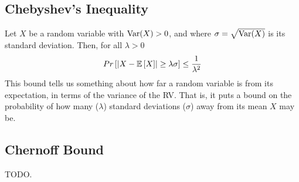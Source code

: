 \documentclass[10pt,a4paper]{article}
\begin{document}
\subsection*{Chebyshev's Inequality}

Let $X$ be a random variable with $\text{Var}(X) > 0$, and where $\sigma = \sqrt{\text{Var}(X)}$ is its standard deviation. Then, for all $\lambda > 0$
\begin{align*}
    Pr \left[ \left| X - \mathbb{E}\left[X\right] \right| \geq \lambda \sigma \right] \leq \dfrac{1}{\lambda^2}
\end{align*}
This bound tells us something about how far a random variable is from its expectation, in terms of the variance of the RV. That is, it puts a bound on the probability of how many ($\lambda$) standard deviations ($\sigma$) away from its mean $X$ may be.


\subsection*{Chernoff Bound}

TODO.



\end{document}
